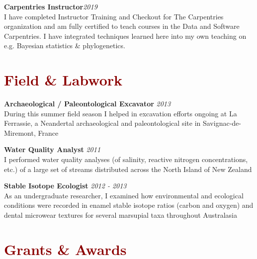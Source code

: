 \documentclass[11pt,margin,line]{resume}
\begin{document}
\begin{resume}
\vspace{-1.5mm}
\textbf{Carpentries Instructor}\hfill \emph{2019}\\
I have completed Instructor Training and Checkout for The Carpentries organization and am fully certified to teach courses in the Data and Software Carpentries. I have integrated techniques learned here into my own teaching on e.g. Bayesian statistics \& phylogenetics.


\vspace{-1.5mm}
\section{\large\textcolor{DarkRed}{Field \& Labwork}}

\textbf{Archaeological / Paleontological Excavator} \hfill \emph{2013}\\
During this summer field season I helped in excavation efforts ongoing at La Ferrassie, a Neandertal archaeological and paleontological site in Savignac-de-Miremont, France

\vspace{-1.5mm}
\textbf{Water Quality Analyst} \hfill \emph{2011}\\
I performed water quality analyses (of salinity, reactive nitrogen concentrations, etc.) of a large set of streams distributed across the North Island of New Zealand

\vspace{-1.5mm}
\textbf{Stable Isotope Ecologist} \hfill \emph{2012 - 2013}\\
As an undergraduate researcher, I examined how environmental and ecological conditions were recorded in enamel stable isotope ratios (carbon and oxygen) and dental microwear textures for several marsupial taxa throughout Australasia

\vspace{-1.5mm}
\section{\large\textcolor{DarkRed}{Grants \& Awards}}



\end{resume}
\end{document}
